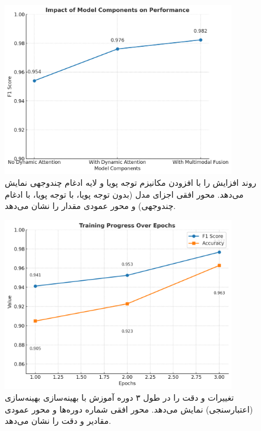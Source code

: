 \begin{figure}[h!]
\centering
\includegraphics[width=0.9\textwidth]{images/fig_ablation_study_en}
\caption{روند افزایش  را با افزودن مکانیزم توجه پویا و لایه ادغام چندوجهی نمایش می‌دهد. محور افقی اجزای مدل (بدون توجه پویا، با توجه پویا، با ادغام چندوجهی) و محور عمودی مقدار  را نشان می‌دهد.}
\label{fig:ablation_study}
\end{figure}

\begin{figure}[h!]
\centering
\includegraphics[width=0.9\textwidth]{images/fig_training_progress_en}
\caption{تغییرات  و دقت را در طول ۳ دوره آموزش با بهینه‌سازی بهینه‌سازی (اعتبارسنجی) نمایش می‌دهد. محور افقی شماره دوره‌ها و محور عمودی مقادیر  و دقت را نشان می‌دهد.}
\label{fig:training_progress}
\end{figure}

     
     
     
     
     
     
     
     
     
     
     
     